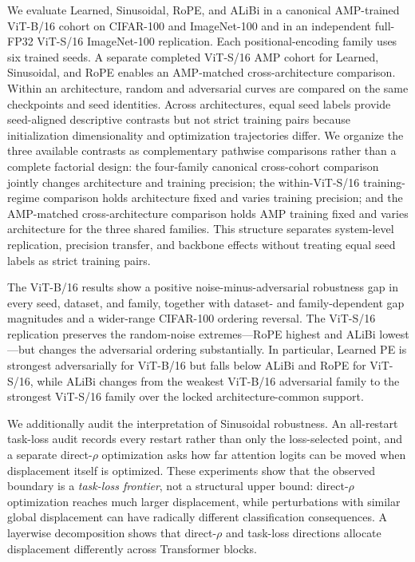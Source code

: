 \documentclass[preprint,12pt,authoryear]{elsarticle}
\begin{document}
We evaluate Learned, Sinusoidal, RoPE, and ALiBi in a canonical
AMP-trained ViT-B/16 cohort on CIFAR-100 and ImageNet-100 and in an
independent full-FP32 ViT-S/16 ImageNet-100 replication. Each
positional-encoding family uses six trained seeds. A separate completed
ViT-S/16 AMP cohort for Learned, Sinusoidal, and RoPE enables an
AMP-matched cross-architecture comparison. Within an architecture, random and adversarial curves
are compared on the same checkpoints and seed identities. Across
architectures, equal seed labels provide seed-aligned descriptive contrasts
but not strict training pairs because initialization dimensionality and
optimization trajectories differ. We organize the three available contrasts as complementary pathwise
comparisons rather than a complete factorial design: the four-family canonical cross-cohort comparison jointly
changes architecture and training precision; the within-ViT-S/16
training-regime comparison holds architecture fixed and varies training
precision; and the AMP-matched cross-architecture comparison holds AMP
training fixed and varies architecture for the three shared families. This structure
separates system-level replication, precision transfer, and backbone effects
without treating equal seed labels as strict training pairs.

The ViT-B/16 results show a positive noise-minus-adversarial robustness
gap in every seed, dataset, and family, together with dataset- and
family-dependent gap magnitudes and a wider-range CIFAR-100 ordering
reversal. The ViT-S/16 replication preserves the random-noise extremes---RoPE
highest and ALiBi lowest---but changes the adversarial ordering substantially. In particular, Learned PE
is strongest adversarially for ViT-B/16 but falls below ALiBi and RoPE for
ViT-S/16, while ALiBi changes from the weakest ViT-B/16 adversarial family
to the strongest ViT-S/16 family over the locked architecture-common
support.

We additionally audit the interpretation of Sinusoidal robustness. An
all-restart task-loss audit records every restart rather than only the
loss-selected point, and a separate direct-$\rho$ optimization asks how
far attention logits can be moved when displacement itself is optimized.
These experiments show that the observed boundary is a
\emph{task-loss frontier}, not a structural upper bound: direct-$\rho$
optimization reaches much larger displacement, while perturbations with
similar global displacement can have radically different classification
consequences. A layerwise decomposition shows that direct-$\rho$ and
task-loss directions allocate displacement differently across Transformer
blocks.
\end{document}
